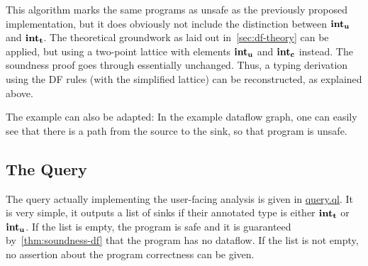 This algorithm marks the same programs as unsafe as the previously proposed implementation,
but it does obviously not include the distinction between $\textbf{int}_\textbf{u}$ and $\textbf{int}_\textbf{t}$.
The theoretical groundwork as laid out in~\autoref{sec:df-theory} can be applied,
but using a two-point lattice with elements $\textbf{int}_\textbf{u}$ and $\textbf{int}_\textbf{c}$ instead.
The soundness proof goes through essentially unchanged.
Thus, a typing derivation using the DF rules (with the simplified lattice) 
can be reconstructed, as explained above.

The example can also be adapted: In the example dataflow graph, one can easily
see that there is a path from the source to the sink, so that program is unsafe.

\subsection{The Query}
The query actually implementing the user-facing analysis is given in \hyperref[lst:query]{query.ql}.
It is very simple, it outputs a list of sinks if their annotated type is 
either $\textbf{int}_\textbf{t}$ or $\textbf{int}_\textbf{u}$.
If the list is empty, the program is safe and it is guaranteed by~\autoref{thm:soundness-df}
that the program has no dataflow.
If the list is not empty, no assertion about the program correctness can be given.

